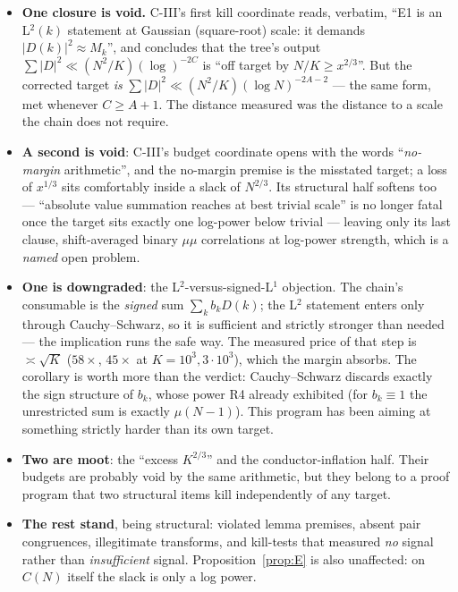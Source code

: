 \documentclass[11pt,a4paper]{article}
\theoremstyle{plain}
\theoremstyle{definition}
\begin{document}
\begin{itemize}
\item \textbf{One closure is void.} C-III's first kill coordinate
  reads, verbatim, ``E1 is an L$^2(k)$ statement at Gaussian
  (square-root) scale: it demands $|D(k)|^2 \approx M_k$'', and
  concludes that the tree's output
  $\sum|D|^2 \ll (N^2/K)(\log)^{-2C}$ is ``off target by
  $N/K \ge x^{2/3}$''. But the corrected target \emph{is}
  $\sum|D|^2 \ll (N^2/K)(\log N)^{-2A-2}$ --- the same form, met
  whenever $C \ge A+1$. The distance measured was the distance to a
  scale the chain does not require.
\item \textbf{A second is void}: C-III's budget coordinate opens with
  the words ``\emph{no-margin} arithmetic'', and the no-margin premise
  is the misstated target; a loss of $x^{1/3}$ sits comfortably inside
  a slack of $N^{2/3}$. Its structural half softens too --- ``absolute
  value summation reaches at best trivial scale'' is no longer fatal
  once the target sits exactly one log-power below trivial --- leaving
  only its last clause, shift-averaged binary $\mu\mu$ correlations at
  log-power strength, which is a \emph{named} open problem.
\item \textbf{One is downgraded}: the L$^2$-versus-signed-L$^1$
  objection. The chain's consumable is the \emph{signed} sum
  $\sum_k b_kD(k)$; the L$^2$ statement enters only through
  Cauchy--Schwarz, so it is sufficient and strictly stronger than
  needed --- the implication runs the safe way. The measured price of
  that step is $\asymp\sqrt K$ ($58\times$, $45\times$ at
  $K=10^3,3\cdot10^3$), which the margin absorbs. The corollary is
  worth more than the verdict: Cauchy--Schwarz discards exactly the
  sign structure of $b_k$, whose power R4 already exhibited (for
  $b_k\equiv1$ the unrestricted sum is exactly $\mu(N-1)$). This
  program has been aiming at something strictly harder than its own
  target.
\item \textbf{Two are moot}: the ``excess $K^{2/3}$'' and the
  conductor-inflation half. Their budgets are probably void by the
  same arithmetic, but they belong to a proof program that two
  structural items kill independently of any target.
\item \textbf{The rest stand}, being structural: violated lemma
  premises, absent pair congruences, illegitimate transforms, and
  kill-tests that measured \emph{no} signal rather than
  \emph{insufficient} signal. Proposition~\ref{prop:E} is also
  unaffected: on $C(N)$ itself the slack is only a log power.
\end{itemize}
\end{document}
